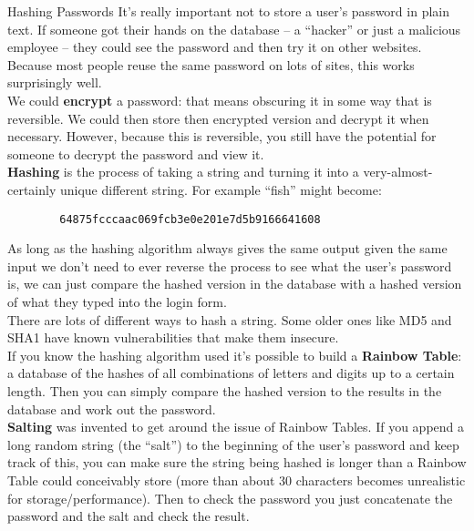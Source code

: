 \begin{infobox}{Hashing Passwords}
    It's really important not to store a user's password in plain text. If someone got their hands on the database – a ``hacker'' or just a malicious employee – they could see the password and then try it on other websites. Because most people reuse the same password on lots of sites, this works surprisingly well.
    \\

    We could \textbf{encrypt} a password: that means obscuring it in some way that is reversible. We could then store then encrypted version and decrypt it when necessary. However, because this is reversible, you still have the potential for someone to decrypt the password and view it.
    \\

    \textbf{Hashing} is the process of taking a string and turning it into a very-almost-certainly unique different string. For example ``fish'' might become:

    \begin{verbatim}
        64875fcccaac069fcb3e0e201e7d5b9166641608
    \end{verbatim}

    As long as the hashing algorithm always gives the same output given the same input we don't need to ever reverse the process to see what the user's password is, we can just compare the hashed version in the database with a hashed version of what they typed into the login form.
    \\

    There are lots of different ways to hash a string. Some older ones like MD5 and SHA1 have known vulnerabilities that make them insecure.
    \\

    If you know the hashing algorithm used it's possible to build a \textbf{Rainbow Table}: a database of the hashes of all combinations of letters and digits up to a certain length. Then you can simply compare the hashed version to the results in the database and work out the password.
    \\

    \textbf{Salting} was invented to get around the issue of Rainbow Tables. If you append a long random string (the ``salt'') to the beginning of the user's password and keep track of this, you can make sure the string being hashed is longer than a Rainbow Table could conceivably store (more than about 30 characters becomes unrealistic for storage/performance). Then to check the password you just concatenate the password and the salt and check the result.
    \\


\end{infobox}
